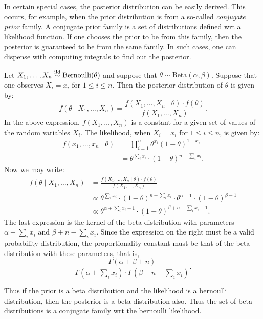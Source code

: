 In certain special cases, the posterior distribution can be easily derived. This 
occurs, for example, when the prior distribution is from a so-called 
\emph{conjugate prior} family. A conjugate prior family is a set of distributions
defined wrt a likelihood function. If one chooses the prior to be from this 
family, then the posterior is guaranteed to be from the same family. In such 
cases, one can dispense with computing integrals to find out the posterior. 

\begin{example} \label{ex:BetaBinomial}
Let $X_1, \ldots, X_n \stackrel{\text{iid}}{\sim} \text{Bernoulli}(\theta)$ and suppose that 
$\theta \sim \text{Beta}(\alpha, \beta)$. Suppose that one observes $X_i = x_i$
for $1 \leq i \leq n$. Then the posterior distribution of $\theta$ is given by:
\[
    f( \theta \mid X_1, \ldots, X_n ) = 
    \frac{f( X_1, \ldots, X_n \mid \theta) \cdot f(\theta)}{ f(X_1, \ldots, X_n)}.
\]
In the above expression, $f(X_1, \ldots, X_n)$ is a constant for a given set 
of values of the random variables $X_i$. The likelihood, 
when $X_i = x_i$ for $1 \leq i \leq n$, is given by:
\begin{align*}
    f( x_1, \ldots, x_n \mid \theta) 
        & = \prod_{i = 1}^{n} \theta^{x_i} (1 - \theta)^{1 - x_i} \\
        & = \theta^{\sum_i x_i} \cdot (1 - \theta)^{n - \sum_i x_i}.
\end{align*}
Now we may write:
\begin{align*}
    f( \theta \mid X_1, \ldots, X_n ) 
        & = \frac{f( X_1, \ldots, X_n \mid \theta) \cdot f(\theta)}{ f(X_1, \ldots, X_n)} \\
        & \propto \theta^{\sum_i x_i} \cdot (1 - \theta)^{n - \sum_i x_i} 
                    \cdot \theta^{\alpha - 1} \cdot (1 - \theta)^{\beta - 1} \\
        & \propto \theta^{\alpha + \sum_i x_i - 1} \cdot (1 - \theta)^{\beta + n - \sum_i x_i - 1}. 
\end{align*}
The last expression is the kernel of the beta distribution with parameters 
$\alpha + \sum_i x_i$ and $\beta + n - \sum_i x_i$. Since the expression on the 
right must be a valid probability distribution, the proportionality constant 
must be that of the beta distribution with these parameters, that is, 
\[
    \frac{\Gamma(\alpha + \beta + n)}{\Gamma(\alpha + \sum_i x_i) \cdot \Gamma(\beta + n - \sum_i x_i)}.
\]  
\eop
\end{example}  

Thus if the prior is a beta distribution and the likelihood is a bernoulli distribution,
then the posterior is a beta distribution also. Thus the set of beta distributions
is a conjugate family wrt the bernoulli likelihood.   
